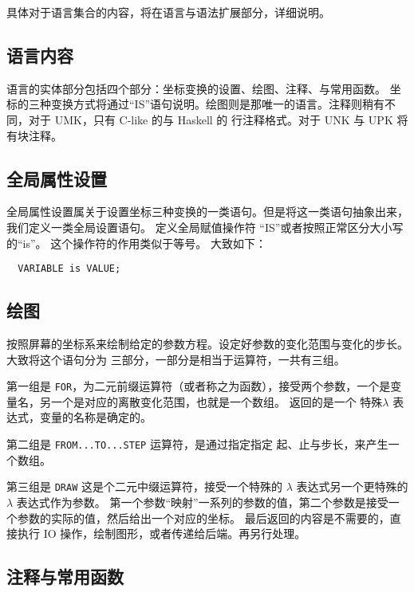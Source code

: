 \documentclass{ctexart}
\begin{document}
具体对于语言集合的内容，将在语言与语法扩展部分，详细说明。

\subsection{语言内容}
\label{sec:intro:lang}

语言的实体部分包括四个部分：坐标变换的设置、绘图、注释、与常用函数。
坐标的三种变换方式将通过“IS”语句说明。绘图则是那唯一的语言。注释则稍有不同，对于 UMK，只有 C-like 的与 Haskell
的 行注释格式。对于 UNK 与 UPK 将有块注释。

\subsection{全局属性设置}
\label{sec:intro:settings}

全局属性设置属关于设置坐标三种变换的一类语句。但是将这一类语句抽象出来，我们定义一类全局设置语句。
定义全局赋值操作符 “IS”或者按照正常区分大小写的“is”。 这个操作符的作用类似于等号。
大致如下：
\begin{lstlisting}
  VARIABLE is VALUE;
\end{lstlisting}

\subsection{绘图}
\label{sec:intro:draw}

按照屏幕的坐标系来绘制给定的参数方程。设定好参数的变化范围与变化的步长。
大致将这个语句分为 三部分，一部分是相当于运算符，一共有三组。

第一组是 \verb|FOR|，为二元前缀运算符（或者称之为函数），接受两个参数，一个是变量名，另一个是对应的离散变化范围，也就是一个数组。
返回的是一个 特殊$\lambda$ 表达式，变量的名称是确定的。

第二组是 \verb|FROM...TO...STEP| 运算符，是通过指定指定 起、止与步长，来产生一个数组。

第三组是 \verb|DRAW| 这是个二元中缀运算符，接受一个特殊的 $\lambda$ 表达式另一个更特殊的$\lambda$ 表达式作为参数。
第一个参数“映射”一系列的参数的值，第二个参数是接受一个参数的实际的值，然后给出一个对应的坐标。
最后返回的内容是不需要的，直接执行 IO 操作，绘制图形，或者传递给后端。再另行处理。

\subsection{注释与常用函数}
\label{sec:intro:commentNfuncs}
\end{document}
